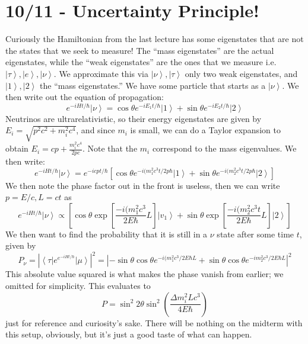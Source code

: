 \documentclass[10pt]{report}
\newcommand{\bra}[1]{\left<#1\right|}
\newcommand{\ket}[1]{\left|#1\right>}
\newcommand{\abs}[1]{\left|#1\right|}
\begin{document}
\chapter{10/11 - Uncertainty Principle!}

Curiously the Hamiltonian from the last lecture has some eigenstates that are not the states that we seek to measure! The ``mass eigenstates'' are the actual eigenstates, while the ``weak eigenstates'' are the ones that we measure i.e.$\ket{\tau},\ket{e},\ket{\nu}$. We approximate this via $\ket{\nu},\ket{\tau}$ only two weak eigenstates, and $\ket{1},\ket{2}$ the ``mass eigenstates.'' We have some particle that starts as a $\ket{\nu}$. We then write out the equation of propagation:
$$e^{-iHt/\hbar}\ket{\nu} = \cos\theta e^{-iE_1t/\hbar}\ket{1} + \sin\theta e^{-iE_2t/\hbar}\ket{2}$$
Neutrinos are ultrarelativistic, so their energy eigenstates are given by $E_i=\sqrt{p^2c^2 + m_i^2c^4}$, and since $m_i$ is small, we can do a Taylor expansion to obtain $E_i=cp+\frac{m_i^2c^4}{2pc}$. Note that the $m_i$ correspond to the mass eigenvalues. We then write:
$$e^{-iHt/\hbar}\ket{\nu} = e^{-icpt/\hbar}\left[ \cos\theta e^{-i(m_1^2c^3t/2p\hbar}\ket{1} + \sin\theta e^{-i(m_2^2c^3t/2p\hbar} \ket{2} \right]$$
We then note the phase factor out in the front is useless, then we can write $p=E/c, L=ct$ as
$$e^{-iHt/\hbar}\ket{\nu} \propto \left[ \cos\theta \exp\left[ \frac{-i(m_1^2c^3}{2E\hbar}L \right]\ket{v_1} + \sin \theta \exp\left[ \frac{-i(m_2^2c^3t}{2E\hbar}L \right]\ket{2} \right]$$
We then want to find the probability that it is still in a $\nu$ state after some time $t$, given by 
$$P_\nu = \abs{\bra{\tau}e^{e^{-iHt/\hbar}}\ket{\mu}}^2 = \abs{-\sin\theta\cos\theta e^{-i(m_1^2c^3/2E\hbar L} + \sin \theta \cos \theta e^{-im_2^2c^3/2E\hbar L}}^2$$
This absolute value squared is what makes the phase vanish from earlier; we omitted for simplicity. This evaluates to
$$P = \sin^2 2\theta \sin^2\left( \frac{\Delta m_i^2 L c^3}{4E\hbar} \right)$$
just for reference and curiosity's sake. There will be nothing on the midterm with this setup, obviously, but it's just a good taste of what can happen. 
\end{document}
